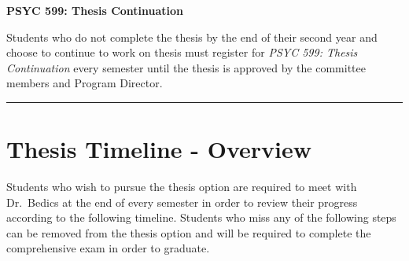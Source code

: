 \documentclass[
  openany]{book}
\begin{document}
\textbf{PSYC 599: Thesis Continuation}

Students who do not complete the thesis by the end of their second year and choose to continue to work on thesis must register for \emph{PSYC 599: Thesis Continuation} every semester until the thesis is approved by the committee members and Program Director.

\begin{center}\rule{0.5\linewidth}{0.5pt}\end{center}

\hypertarget{thesis-timeline---overview}{%
\chapter{Thesis Timeline - Overview}\label{thesis-timeline---overview}}

Students who wish to pursue the thesis option are required to meet with Dr.~Bedics at the end of every semester in order to review their progress according to the following timeline. Students who miss any of the following steps can be removed from the thesis option and will be required to complete the comprehensive exam in order to graduate.
\end{document}
